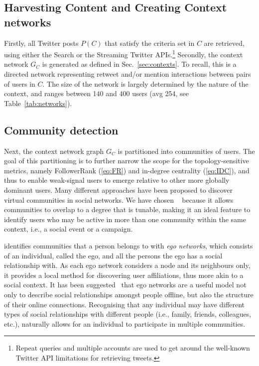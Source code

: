 \subsection{Harvesting Content and Creating Context networks} \label{sec:harvesting}

Firstly, all Twitter posts $P(C)$ that satisfy the criteria set in $C$ are retrieved, using either the Search or the Streaming Twitter APIs.\footnote{Repeat queries and multiple accounts are used to get around the well-known Twitter API limitations for retrieving tweets.}
%
Secondly, the context network $G_C$ is generated as defined in Sec.~\ref{sec:contexts}. To recall, this is a directed network representing retweet and/or mention interactions between pairs of users in $C$. 
The size of the network is largely determined by the nature of the context, and  ranges between 140 and 400 users (avg 254, see Table~\ref{tab:networks}).

\subsection{Community detection} \label{sec:communities}

Next, the context network graph $G_C$  is partitioned into communities of users.
The goal of this partitioning is to further narrow the scope for the topology-sensitive metrics, namely FollowerRank (\ref{eq:FR}) and in-degree centrality (\ref{eq:IDC}), 
and thus to enable weak-signal users to emerge relative to other more globally dominant users.
%
Many different approaches have been proposed to discover virtual communities in social networks. 
We have chosen \demon~\cite{Coscia:2012:DLD:2339530.2339630} because it allows communities to overlap to a degree that is tunable, making it an ideal feature to identify users who may be active in more than one community within the same context, i.e., a social event or a campaign.

\demon identifies communities that a person belongs to with \textit{ego networks}, which consists of an individual, called the ego, and all the persons the ego has a social relationship with. 
As each ego network considers a node and its neighbours only, it provides a local method for discovering user affiliations, thus more akin to a social context.
%
It has been suggested~\cite{Arnaboldi2013} that ego networks are a useful model not only to describe social relationships amongst people offline, but also the structure of their online connections. 
Recognising that any individual may have different types of social relationships with different people (i.e., family, friends, colleagues, etc.),  \demon  naturally allows for an individual to participate in multiple communities. 


